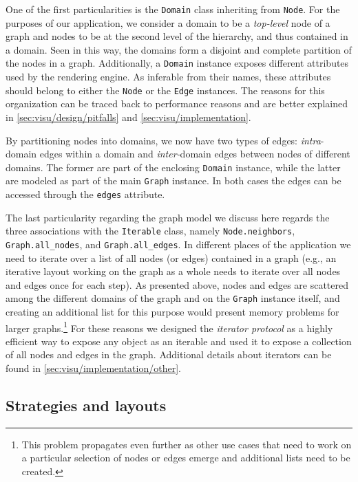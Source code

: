 One of the first particularities is the \texttt{Domain} class inheriting from \texttt{Node}. For the purposes of our application, we consider a domain to be a \emph{top-level} node of a graph and nodes to be at the second level of the hierarchy, and thus contained in a domain. Seen in this way, the domains form a disjoint and complete partition of the nodes in a graph. Additionally, a \texttt{Domain} instance exposes different attributes used by the rendering engine. As inferable from their names, these attributes should belong to either the \texttt{Node} or the \texttt{Edge} instances. The reasons for this organization can be traced back to performance reasons and are better explained in \vref{sec:visu/design/pitfalls} and \vref{sec:visu/implementation}.

By partitioning nodes into domains, we now have two types of edges: \emph{intra}-domain edges within a domain and \emph{inter-}domain edges between nodes of different domains. The former are part of the enclosing \texttt{Domain} instance, while the latter are modeled as part of the main \texttt{Graph} instance. In both cases the edges can be accessed through the \texttt{edges} attribute.

The last particularity regarding the graph model we discuss here regards the three associations with the \texttt{Iterable} class, namely \texttt{Node.neighbors}, \texttt{Graph.all\_nodes}, and \texttt{Graph.all\_edges}. In different places of the application we need to iterate over a list of all nodes (or edges) contained in a graph (e.g., an iterative layout working on the graph as a whole needs to iterate over all nodes and edges once for each step). As presented above, nodes and edges are scattered among the different domains of the graph and on the \texttt{Graph} instance itself, and creating an additional list for this purpose would present memory problems for larger graphs.\footnote{This problem propagates even further as other use cases that need to work on a particular selection of nodes or edges emerge and additional lists need to be created.} For these reasons we designed the \emph{iterator protocol} as a highly efficient way to expose any object as an iterable and used it to expose a collection of all nodes and edges in the graph. Additional details about iterators can be found in \vref{sec:visu/implementation/other}.


\subsection{Strategies and layouts}
\label{sec:visu/design/layout}

